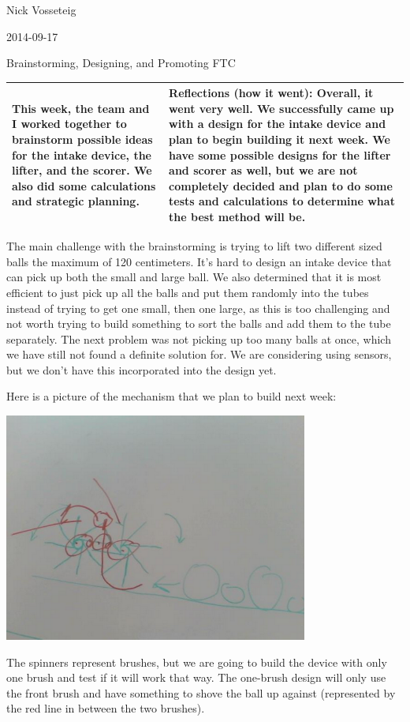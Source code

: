 Nick Vosseteig

2014-09-17

Brainstorming, Designing, and Promoting FTC

\begin{tabular}{|p{5cm}|p{5cm}|}
 \hline
This week, the team and I worked together to brainstorm possible ideas for the intake device, the lifter, and the scorer. We also did some calculations and strategic planning. &
Reflections (how it went):
Overall, it went very well. We successfully came up with a design for the intake device and plan to begin building it next week. We have some possible designs for the lifter and scorer as well, but we are not completely decided and plan to do some tests and calculations to determine what the best method will be.
 \\
 \hline
\end{tabular}

The main challenge with the brainstorming is trying to lift two different sized balls the maximum of 120 centimeters. It’s hard to design an intake device that can pick up both the small and large ball. We also determined that it is most efficient to just pick up all the balls and put them randomly into the tubes instead of trying to get one small, then one large, as this is too challenging and not worth trying to build something to sort the balls and add them to the tube separately. The next problem was not picking up too many balls at once, which we have still not found a definite solution for. We are considering using sensors, but we don’t have this incorporated into the design yet. 

Here is a picture of the mechanism that we plan to build next week:
\begin{center}
 \includegraphics[width=10cm]{./Entries/Images/intake_device.png}
\end{center}
The spinners represent brushes, but we are going to build the device with only one brush and test if it will work that way. The one-brush design will only use the front brush and have something to shove the ball up against (represented by the red line in between the two brushes).
